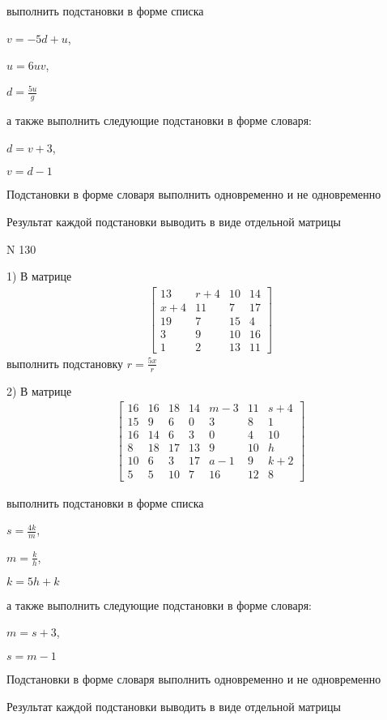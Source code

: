 \documentclass[11pt]{report}
\begin{document}
выполнить подстановки в форме списка

$v=- 5 d + u$,

$u=6 u v$,

$d=\frac{5 u}{g}$

а также выполнить следующие подстановки в форме словаря:

$d=v + 3$,

$v=d - 1$


    Подстановки в форме словаря выполнить одновременно и не одновременно


    Результат каждой подстановки выводить в виде отдельной матрицы

\newpage
N 130


    1) В матрице
\begin{align*}
\left[\begin{matrix}13 & r + 4 & 10 & 14\\x + 4 & 11 & 7 & 17\\19 & 7 & 15 & 4\\3 & 9 & 10 & 16\\1 & 2 & 13 & 11\end{matrix}\right]
\end{align*}
выполнить подстановку $r=\frac{5 x}{r}$


    2) В матрице
\begin{align*}
\left[\begin{matrix}16 & 16 & 18 & 14 & m - 3 & 11 & s + 4\\15 & 9 & 6 & 0 & 3 & 8 & 1\\16 & 14 & 6 & 3 & 0 & 4 & 10\\8 & 18 & 17 & 13 & 9 & 10 & h\\10 & 6 & 3 & 17 & a - 1 & 9 & k + 2\\5 & 5 & 10 & 7 & 16 & 12 & 8\end{matrix}\right]
\end{align*}

выполнить подстановки в форме списка

$s=\frac{4 k}{m}$,

$m=\frac{k}{h}$,

$k=5 h + k$

а также выполнить следующие подстановки в форме словаря:

$m=s + 3$,

$s=m - 1$


    Подстановки в форме словаря выполнить одновременно и не одновременно


    Результат каждой подстановки выводить в виде отдельной матрицы
\end{document}
